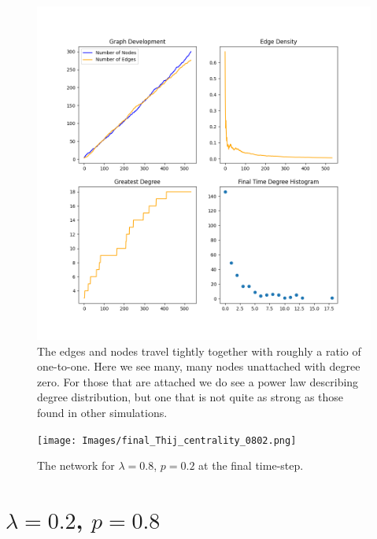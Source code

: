 \begin{figure}[h!]
    \includegraphics[width=14cm]{Images/twitter_sim_stats_3_0.8_0.2.png}
    \centering
    \caption{The edges and nodes travel tightly together with roughly a ratio of 
     one-to-one. Here we see many, many nodes unattached with degree zero.
    For those that are attached we do see a power law describing degree distribution, but one that is not quite
    as strong as those found in other simulations.}
\end{figure}


\begin{figure}[h!]
    \texttt{[image: Images/final\_Thij\_centrality\_0802.png]}
    \centering
    \caption{The network for $\lambda=0.8$, $p=0.2$ at the final time-step.}
\end{figure}

\clearpage

\section{$\lambda=0.2$, $p=0.8$}

